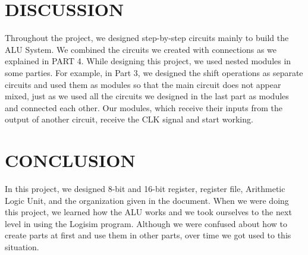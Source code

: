 \documentclass[pdftex,12pt,a4paper]{article}
\begin{document}
\section{DISCUSSION }
Throughout the project, we designed step-by-step circuits mainly to build the ALU System. We combined the circuits we created with connections as we explained in PART 4. While designing this project, we used nested modules in some parties.
For example, in Part 3, we designed the shift operations as separate circuits and used them as modules so that the main circuit does not appear mixed, just as we used all the circuits we designed in the last part as modules and connected each other. Our modules, which receive their inputs from the output of another circuit, receive the CLK signal and start working.


\section{CONCLUSION }
In this project, we designed 8-bit and 16-bit register, register file, Arithmetic Logic Unit, and the organization given in the document. When we were doing this project, we learned how the ALU works and we took ourselves to the next level in using the Logisim program. Although we were confused about how to create parts at first and use them in other parts, over time we got used to this situation.

\newpage
{}
\end{document}
